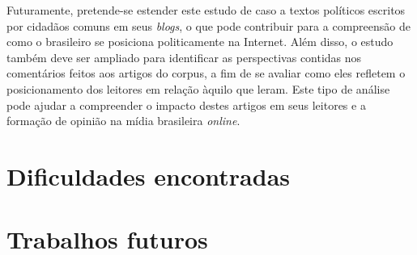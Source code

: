 
Futuramente, pretende-se estender este estudo de caso a textos políticos escritos por cidadãos comuns em seus \emph{blogs}, o que pode contribuir para a compreensão de como o brasileiro se posiciona politicamente na Internet. Além disso, o estudo também deve ser ampliado para identificar as perspectivas contidas nos comentários feitos aos artigos do corpus, a fim de se avaliar como eles refletem o posicionamento dos leitores em relação àquilo que leram. Este tipo de análise pode ajudar a compreender o impacto destes artigos em seus leitores e a formação de opinião na mídia brasileira \emph{online}.



\section{Dificuldades encontradas}

\section{Trabalhos futuros}



